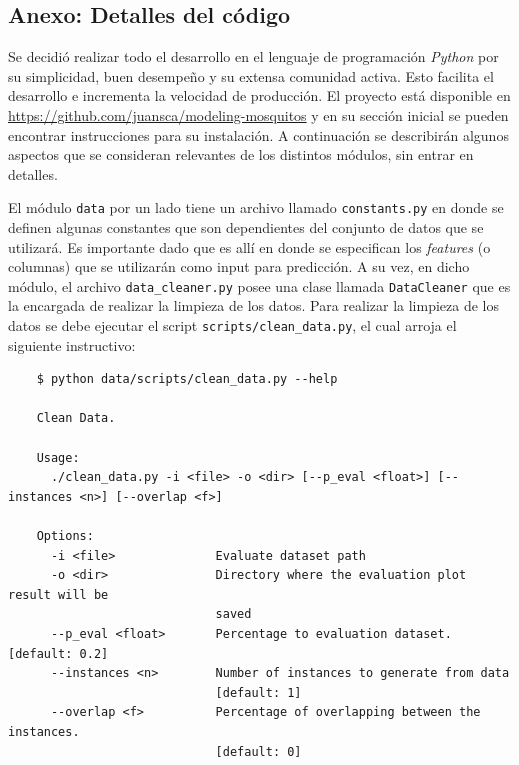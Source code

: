 \begin{appendix}
\chapter{Anexo: Detalles del código}\label{Anexo_codigo}

  \par Se decidió realizar todo el desarrollo en el lenguaje de programación
    \textit{Python} por su simplicidad, buen desempeño y su extensa
    comunidad activa. Esto facilita el desarrollo e incrementa la velocidad
    de producción. El proyecto está disponible
    en \url{https://github.com/juansca/modeling-mosquitos} y en su sección
    inicial se pueden encontrar instrucciones para su instalación.
    A continuación se describirán
    algunos aspectos que se consideran relevantes de los distintos módulos,
    sin entrar en detalles.

  \par El módulo \verb|data| por un lado tiene un archivo llamado
    \verb|constants.py| en donde se definen algunas constantes que
    son dependientes del conjunto de datos que se utilizará. Es importante
    dado que es allí en donde se especifican los \textit{features} (o
    columnas) que se utilizarán como input para predicción.
    A su vez, en dicho módulo, el archivo \verb|data_cleaner.py|
    posee una clase llamada \verb|DataCleaner| que es la encargada de
    realizar la limpieza de los datos. Para realizar la limpieza de los
    datos se debe ejecutar el script \verb|scripts/clean_data.py|, el
    cual arroja el siguiente instructivo:

    \begin{lstlisting}
    $ python data/scripts/clean_data.py --help

    Clean Data.

    Usage:
      ./clean_data.py -i <file> -o <dir> [--p_eval <float>] [--instances <n>] [--overlap <f>]

    Options:
      -i <file>              Evaluate dataset path
      -o <dir>               Directory where the evaluation plot result will be
                             saved
      --p_eval <float>       Percentage to evaluation dataset. [default: 0.2]
      --instances <n>        Number of instances to generate from data
                             [default: 1]
      --overlap <f>          Percentage of overlapping between the instances.
                             [default: 0]

    \end{lstlisting}



\end{appendix}
